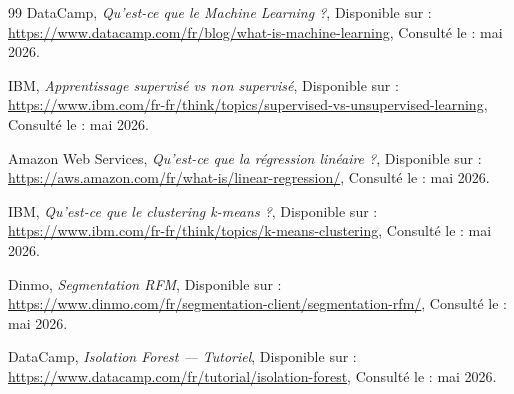 \documentclass[12pt, oneside, a4paper]{report}
\begin{document}
\begin{thebibliography}{99}
DataCamp,
\textit{Qu'est-ce que le Machine Learning ?},
Disponible sur : \url{https://www.datacamp.com/fr/blog/what-is-machine-learning},
Consulté le : mai 2026.

IBM,
\textit{Apprentissage supervisé vs non supervisé},
Disponible sur : \url{https://www.ibm.com/fr-fr/think/topics/supervised-vs-unsupervised-learning},
Consulté le : mai 2026.

Amazon Web Services,
\textit{Qu'est-ce que la régression linéaire ?},
Disponible sur : \url{https://aws.amazon.com/fr/what-is/linear-regression/},
Consulté le : mai 2026.

IBM,
\textit{Qu'est-ce que le clustering k-means ?},
Disponible sur : \url{https://www.ibm.com/fr-fr/think/topics/k-means-clustering},
Consulté le : mai 2026.

Dinmo,
\textit{Segmentation RFM},
Disponible sur : \url{https://www.dinmo.com/fr/segmentation-client/segmentation-rfm/},
Consulté le : mai 2026.

DataCamp,
\textit{Isolation Forest — Tutoriel},
Disponible sur : \url{https://www.datacamp.com/fr/tutorial/isolation-forest},
Consulté le : mai 2026.

\end{thebibliography}
\end{document}
